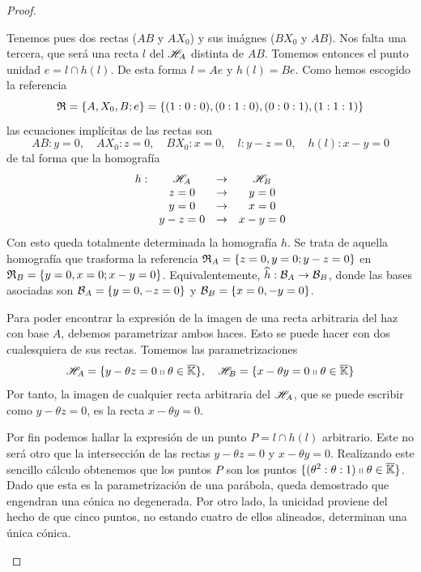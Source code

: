 \begin{proof}
\begin{enumerate}
		Tenemos pues dos rectas ($AB$ y $AX_0$) y sus imágnes ($BX_0$ y $AB$). Nos falta una tercera, que será una recta $l$ del $\mathscr{H}_A$ distinta de $AB$. Tomemos entonces el punto unidad $e=l\cap h(l)$. De esta forma $l=Ae$ y $h(l)=Be$. Como hemos escogido la referencia \[\mathfrak{R}=\{A,X_0,B;e\}=\{(1:0:0),(0:1:0),(0:0:1),(1:1:1)\}\]
		las ecuaciones implícitas de las rectas son
		\begin{equation*}
			AB:y=0, \quad AX_0: z=0, \quad BX_0:x=0, \quad l:y-z=0, \quad h(l):x-y=0
		\end{equation*}
		de tal forma que la homografía
		\begin{equation*}
			\begin{array}{cccc}
			h:&\mathscr{H}_A&\rightarrow&\mathscr{H}_B\\
			&z=0 &\rightarrow& y=0\\
			&y=0 &\rightarrow& x=0\\
			&y-z=0 &\rightarrow& x-y=0
			\end{array}
		\end{equation*}
		Con esto queda totalmente determinada la homografía $h$. Se trata de aquella homografía que trasforma la referencia $\mathfrak{R}_A=\{z=0,y=0;y-z=0\}$ en $\mathfrak{R}_B=\{y=0,x=0;x-y=0\}$. Equivalentemente, $\widehat{h}:\mathcal{B}_A\rightarrow \mathcal{B}_B$, donde las bases asociadas son $\mathcal{B}_A=\{y=0,-z=0\}$ y $\mathcal{B}_B=\{x=0,-y=0\}$.
		
		Para poder encontrar la expresión de la imagen de una recta arbitraria del haz con base $A$, debemos parametrizar ambos haces. Esto se puede hacer con dos cualesquiera de sus rectas. Tomemos las parametrizaciones
		\begin{equation*}
			\mathscr{H}_A=\{y-\theta z=0\shortparallel \theta\in\overline{\mathbb{K}}\}, \quad \mathscr{H}_B=\{x-\theta y=0\shortparallel \theta\in\overline{\mathbb{K}}\}
		\end{equation*}
		Por tanto, la imagen de cualquier recta arbitraria del $\mathscr{H}_A$, que se puede escribir como $y-\theta z=0$, es la recta $x-\theta y=0$.
		
		Por fin podemos hallar la expresión de un punto $P=l\cap h(l)$ arbitrario. Este no será otro que la intersección de las rectas $y-\theta z=0$ y $x-\theta y=0$. Realizando este sencillo cálculo obtenemos que los puntos $P$ son los puntos $\{(\theta^2:\theta:1)\shortparallel \theta\in\overline{\mathbb{K}}\}$. Dado que esta es la parametrización de una parábola, queda demostrado que engendran una cónica no degenerada. Por otro lado, la unicidad proviene del hecho de que cinco puntos, no estando cuatro de ellos alineados, determinan una única cónica.
		

\end{enumerate}
\end{proof}
